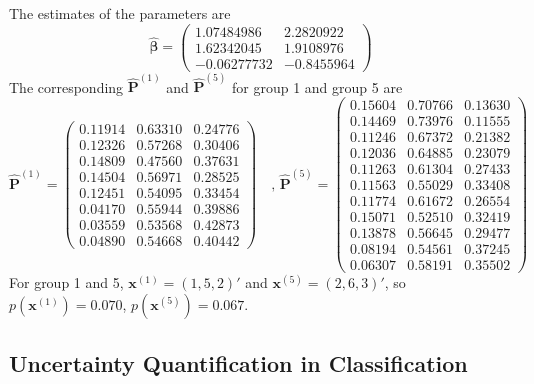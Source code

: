 \documentclass[12pt]{article}
\begin{document}
The estimates of the parameters are
\begin{equation*}
\hat{\boldsymbol{\beta}} = 
\begin{pmatrix}
 1.07484986 & 2.2820922 \\
 1.62342045 & 1.9108976 \\
 -0.06277732 &-0.8455964
\end{pmatrix}
\end{equation*}
The corresponding $\hat{\boldsymbol{P}}^{(1)}$ and $\hat{\boldsymbol{P}}^{(5)}$ for group 1 and group 5 are
\begin{equation*}
    \hat{\boldsymbol{P}}^{(1)} = \begin{pmatrix}

 0.11914 & 0.63310 & 0.24776\\
 0.12326 & 0.57268 & 0.30406\\
 0.14809 & 0.47560 & 0.37631\\
 0.14504 & 0.56971 & 0.28525\\
 0.12451 & 0.54095 & 0.33454\\
 0.04170 & 0.55944 & 0.39886\\
 0.03559 & 0.53568 & 0.42873\\
 0.04890 & 0.54668 & 0.40442
    \end{pmatrix} \quad \text{, }
    \hat{\boldsymbol{P}}^{(5)} = \begin{pmatrix}
 0.15604 & 0.70766 & 0.13630\\
 0.14469 & 0.73976 & 0.11555\\
 0.11246 & 0.67372 & 0.21382\\
 0.12036 & 0.64885 & 0.23079\\
 0.11263 & 0.61304 & 0.27433\\
 0.11563 & 0.55029 & 0.33408\\
 0.11774 & 0.61672 & 0.26554\\
 0.15071 & 0.52510 & 0.32419\\
 0.13878 & 0.56645 & 0.29477\\
 0.08194 & 0.54561 & 0.37245\\
 0.06307 & 0.58191 & 0.35502
    \end{pmatrix}
\end{equation*}
For group 1 and 5, $\boldsymbol{x}^{(1)} = (1,5,2)'$ and $\boldsymbol{x}^{(5)} = (2,6,3)'$, so $p(\boldsymbol{x}^{(1)}) = 0.070$, $p(\boldsymbol{x}^{(5)}) = 0.067$.
\subsection{Uncertainty Quantification in Classification}
\end{document}
